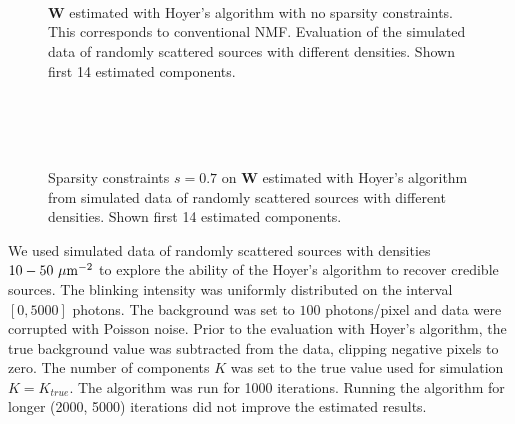 \begin{figure}[!tb] %
	\newcommand{\sizefig}{.9}
	\centering
	\\
	\\
	\\	
	\caption{$\bm{W}$ estimated with Hoyer's algorithm with no sparsity constraints. This corresponds to conventional NMF. Evaluation of the simulated data of randomly scattered sources with different densities. Shown first 14 estimated components.}
	\label{fig: Hoyer no sparsity constraint}
\end{figure}

\begin{figure}[b!] %
	\newcommand{\sizefig}{.9}
	\centering
	\\
	\\
	\\	
	\caption{Sparsity constraints $s=0.7$ on $\bm{W}$ estimated with Hoyer's algorithm from simulated data of randomly scattered sources with different densities. Shown first 14 estimated components.}
	\label{fig: Hoyer sparsity 0.7}
\end{figure}

We used simulated data of randomly scattered sources with densities $10-50\,\, \mathrm{\mu m}^{-2}$ to explore the ability of the Hoyer's algorithm to recover credible sources. The blinking intensity was uniformly distributed on the interval $[0, 5000]$ photons. The background was set to $100$ photons/pixel and data were corrupted with Poisson noise. Prior to the evaluation with Hoyer's algorithm, the true background value was subtracted from the data, clipping negative pixels to zero. The number of components $K$ was set to the true value used for simulation $K=K_{true}$. The algorithm was run for 1000 iterations. Running the algorithm for longer (2000, 5000) iterations did not improve the estimated results. 

